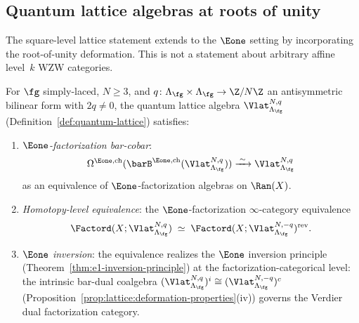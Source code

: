 \subsection{Quantum lattice algebras at roots of unity}

The square-level lattice statement extends to the $\Eone$ setting by
incorporating the root-of-unity deformation. This is not a statement
about arbitrary affine level~$k$ WZW categories.

\begin{theorem}
\label{thm:lattice:quantum-factorization-dk}
For $\fg$ simply-laced, $N \geq 3$, and $q \colon \Lambda_\fg
\times \Lambda_\fg \to \Z/N\Z$ an antisymmetric bilinear
form with $2q\neq0$, the quantum lattice algebra
$\Vlat_{\Lambda_\fg}^{N,q}$
\textup{(}Definition~\textup{\ref{def:quantum-lattice})} satisfies:
\begin{enumerate}[label=(\roman*)]
\item \emph{$\Eone$-factorization bar-cobar}:
 \[
 \Omega^{\Eone,\mathrm{ch}}(
 \barB^{\Eone,\mathrm{ch}}(\Vlat_{\Lambda_\fg}^{N,q}))
 \xrightarrow{\;\sim\;}
 \Vlat_{\Lambda_\fg}^{N,q}
 \]
 as an equivalence of $\Eone$-factorization algebras on $\Ran(X)$.
\item \emph{Homotopy-level equivalence}: the
 $\Eone$-factorization $\infty$-category equivalence
 \begin{equation}\label{eq:lattice:quantum-fact-dk}
 \Factord(X; \Vlat_{\Lambda_\fg}^{N,q})
 \;\simeq\;
 \Factord(X; \Vlat_{\Lambda_\fg}^{N,-q})^{\mathrm{rev}}.
 \end{equation}
\item \emph{$\Eone$ inversion}: the equivalence realizes the
 $\Eone$ inversion principle
 \textup{(}Theorem~\textup{\ref{thm:e1-inversion-principle})}
 at the factorization-categorical level: the intrinsic bar-dual
 coalgebra
 $(\Vlat_{\Lambda_\fg}^{N,q})^i
 \cong (\Vlat_{\Lambda_\fg}^{N,-q})^c$
 \textup{(}Proposition~\textup{\ref{prop:lattice:deformation-properties}(iv))}
 governs the Verdier dual factorization category.
\end{enumerate}
\end{theorem}


